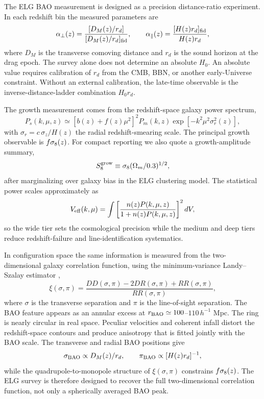 The ELG BAO measurement is designed as a precision distance-ratio experiment. In each redshift bin the measured parameters are
\begin{equation}
  \alpha_\perp(z)=
  \frac{[D_M(z)/r_d]}{[D_M(z)/r_d]_{\rm fid}},\qquad
  \alpha_\parallel(z)=
  \frac{[H(z)r_d]_{\rm fid}}{H(z)r_d},
\end{equation}
where $D_M$ is the transverse comoving distance and $r_d$ is the sound horizon at the drag epoch. The survey alone does not determine an absolute $H_0$. An absolute value requires calibration of $r_d$ from the CMB, BBN, or another early-Universe constraint. Without an external calibration, the late-time observable is the inverse-distance-ladder combination $H_0r_d$.

The growth measurement comes from the redshift-space galaxy power spectrum,
\begin{equation}
  P_s(k,\mu,z)\simeq
  \left[b(z)+f(z)\mu^2\right]^2 P_m(k,z)
  \exp\!\left[-k^2\mu^2\sigma_r^2(z)\right],
\end{equation}
with $\sigma_r=c\,\sigma_z/H(z)$ the radial redshift-smearing scale. The principal growth observable is $f\sigma_8(z)$. For compact reporting we also quote a growth-amplitude summary,
\begin{equation}
  S_8^{\rm grow}\equiv \sigma_8(\Omega_m/0.3)^{1/2},
\end{equation}
after marginalizing over galaxy bias in the ELG clustering model. The statistical power scales approximately as
\begin{equation}
  V_{\rm eff}(k,\mu)=
  \int \left[\frac{n(z)P(k,\mu,z)}{1+n(z)P(k,\mu,z)}\right]^2 dV,
  \label{eq:veff}
\end{equation}
so the wide tier sets the cosmological precision while the medium and deep tiers reduce redshift-failure and line-identification systematics.

In configuration space the same information is measured from the two-dimensional galaxy correlation function, using the minimum-variance Landy--Szalay estimator \cite{landyszalay1993},
\begin{equation}
  \xi(\sigma,\pi)=\frac{DD(\sigma,\pi)-2DR(\sigma,\pi)+RR(\sigma,\pi)}
  {RR(\sigma,\pi)},
  \label{eq:xiestimator}
\end{equation}
where $\sigma$ is the transverse separation and $\pi$ is the line-of-sight separation. The BAO feature appears as an annular excess at $r_{\rm BAO}\simeq100$--$110\,h^{-1}$ Mpc. The ring is nearly circular in real space. Peculiar velocities and coherent infall distort the redshift-space contours and produce anisotropy that is fitted jointly with the BAO scale. The transverse and radial BAO positions give
\begin{equation}
  \sigma_{\rm BAO}\propto D_M(z)/r_d,\qquad
  \pi_{\rm BAO}\propto [H(z)r_d]^{-1},
\end{equation}
while the quadrupole-to-monopole structure of $\xi(\sigma,\pi)$ constrains $f\sigma_8(z)$. The ELG survey is therefore designed to recover the full two-dimensional correlation function, not only a spherically averaged BAO peak.

